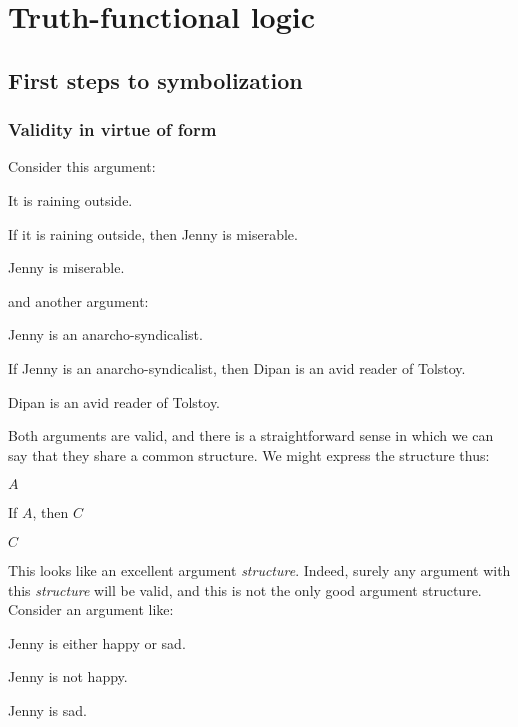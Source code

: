 \part{Truth-functional logic}
\label{ch.TFL}

\chapter{First steps to symbolization}

\section{Validity in virtue of form}\label{s:ValidityInVirtueOfForm}
Consider this argument:
	\begin{earg}
		\item[] It is raining outside.
		\item[] If it is raining outside, then Jenny is miserable.
		\item[\therefore] Jenny is miserable.
	\end{earg}
and another argument:
	\begin{earg}
		\item[] Jenny is an anarcho-syndicalist.
		\item[] If Jenny is an anarcho-syndicalist, then Dipan is an avid reader of Tolstoy.
		\item[\therefore] Dipan is an avid reader of Tolstoy.
	\end{earg}
Both arguments are valid, and there is a straightforward sense in which we can say that they share a common structure. We might express the structure thus:
	\begin{earg}
		\item[] $A$
		\item[] If $A$, then $C$
		\item[\therefore] $C$
	\end{earg}
This looks like an excellent argument \emph{structure}. Indeed, surely any argument with this \emph{structure} will be valid, and this is not the only good argument structure. Consider an argument like:
	\begin{earg}
		\item[] Jenny is either happy or sad.
		\item[] Jenny is not happy.
		\item[\therefore] Jenny is sad.
	\end{earg}
